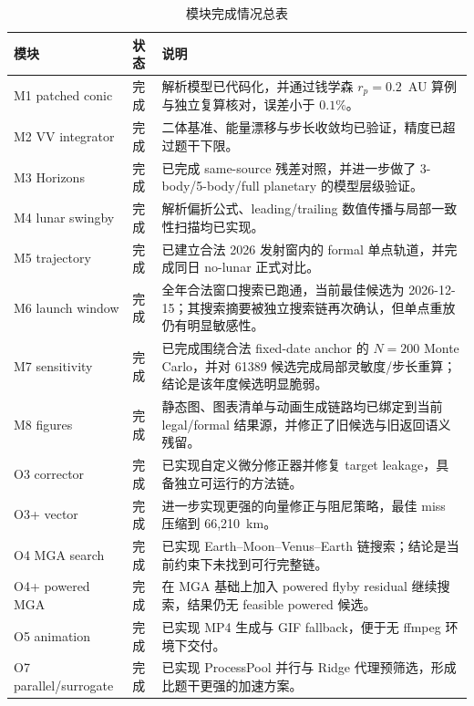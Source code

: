\documentclass[12pt,a4paper]{ctexart}
\begin{document}
\begin{table}[H]
\centering
\caption{模块完成情况总表}
{\small
\begin{tabular}{>{\raggedright\arraybackslash}p{}>{\raggedright\arraybackslash}p{}>{\raggedright\arraybackslash}p{}}
\toprule
模块 & 状态 & 说明 \\
\midrule
M1 patched conic & 完成 & 解析模型已代码化，并通过钱学森 $r_p=0.2$~AU 算例与独立复算核对，误差小于 $0.1\%$。 \\
M2 VV integrator & 完成 & 二体基准、能量漂移与步长收敛均已验证，精度已超过题干下限。 \\
M3 Horizons & 完成 & 已完成 same-source 残差对照，并进一步做了 3-body/5-body/full planetary 的模型层级验证。 \\
M4 lunar swingby & 完成 & 解析偏折公式、leading/trailing 数值传播与局部一致性扫描均已实现。 \\
M5 trajectory & 完成 & 已建立合法 2026 发射窗内的 formal 单点轨道，并完成同日 no-lunar 正式对比。 \\
M6 launch window & 完成 & 全年合法窗口搜索已跑通，当前最佳候选为 2026-12-15；其搜索摘要被独立搜索链再次确认，但单点重放仍有明显敏感性。 \\
M7 sensitivity & 完成 & 已完成围绕合法 fixed-date anchor 的 $N=200$ Monte Carlo，并对 61389 候选完成局部灵敏度/步长重算；结论是该年度候选明显脆弱。 \\
M8 figures & 完成 & 静态图、图表清单与动画生成链路均已绑定到当前 legal/formal 结果源，并修正了旧候选与旧返回语义残留。 \\
\hline
O3 corrector & 完成 & 已实现自定义微分修正器并修复 target leakage，具备独立可运行的方法链。 \\
O3+ vector & 完成 & 进一步实现更强的向量修正与阻尼策略，最佳 miss 压缩到 66,210~km。 \\
O4 MGA search & 完成 & 已实现 Earth--Moon--Venus--Earth 链搜索；结论是当前约束下未找到可行完整链。 \\
O4+ powered MGA & 完成 & 在 MGA 基础上加入 powered flyby residual 继续搜索，结果仍无 feasible powered 候选。 \\
O5 animation & 完成 & 已实现 MP4 生成与 GIF fallback，便于无 ffmpeg 环境下交付。 \\
O7 parallel/surrogate & 完成 & 已实现 ProcessPool 并行与 Ridge 代理预筛选，形成比题干更强的加速方案。 \\
\bottomrule
\end{tabular}
}
\end{table}
\end{document}
